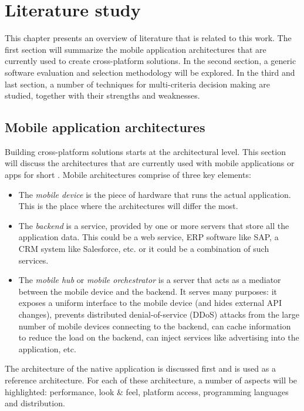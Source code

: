 \chapter{Literature study}
\label{chap:literature}

This chapter presents an overview of literature that is related to this work. The first section will summarize the mobile application architectures that are currently used to create cross-platform solutions. In the second section, a generic software evaluation and selection methodology will be explored. In the third and last section, a number of techniques for multi-criteria decision making are studied, together with their strengths and weaknesses.

\section{Mobile application architectures}

Building cross-platform solutions starts at the architectural level. This section will discuss the architectures that are currently used with mobile applications or apps for short \cite{Friese}. Mobile architectures comprise of three key elements: 

\begin{itemize}
    \item The \emph{mobile device} is the piece of hardware that runs the actual application. This is the place where the architectures will differ the most.
    \item The \emph{backend} is a service, provided by one or more servers that store all the application data. This could be a web service, ERP software like SAP, a CRM system like Salesforce, etc. or it could be a combination of such services.
    \item The \emph{mobile hub} or \emph{mobile orchestrator} is a server that acts as a mediator between the mobile device and the backend. It serves many purposes: it exposes a uniform interface to the mobile device (and hides external API changes), prevents distributed denial-of-service (DDoS) attacks from the large number of mobile devices connecting to the backend, can cache information to reduce the load on the backend, can inject services like advertising into the application, etc.
\end{itemize}

The architecture of the native application is discussed first and is used as a reference architecture. For each of these architecture, a number of aspects will be highlighted: performance, look \& feel, platform access, programming languages and distribution. %

